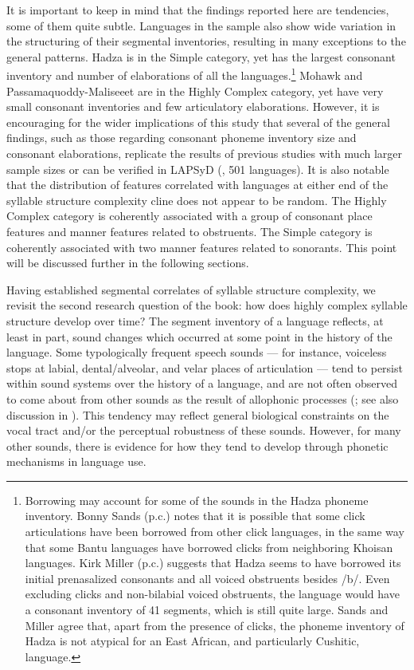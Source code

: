   It is important to keep in mind that the findings reported here are tendencies, some of them quite subtle. Languages in the sample also show wide variation in the structuring of their segmental inventories, resulting in many exceptions to the general patterns. Hadza is in the Simple category, yet has the largest consonant inventory and number of elaborations of all the languages.\footnote{ \textrm{Borrowing may account for some of the sounds in the Hadza phoneme inventory. Bonny Sands (p.c.) notes that it is possible that some click articulations have been borrowed from other click languages, in the same way that some Bantu languages have borrowed clicks from neighboring Khoisan languages. Kirk Miller (p.c.) suggests that Hadza seems to have borrowed its initial prenasalized consonants and all voiced obstruents besides /b/. Even excluding clicks and non-bilabial voiced obstruents, the language would have a consonant inventory of 41 segments, which is still quite large. Sands and Miller agree that, apart from the presence of clicks, the phoneme inventory of Hadza is not atypical for an East African, and particularly Cushitic, language.}} Mohawk and Passamaquoddy-Maliseeet are in the Highly Complex category, yet have very small consonant inventories and few articulatory elaborations. However, it is encouraging for the wider implications of this study that several of the general findings, such as those regarding consonant phoneme inventory size and consonant elaborations, replicate the results of previous studies with much larger sample sizes or can be verified in LAPSyD (\citealt{MaddiesonEtAl2013}, 501 languages). It is also notable that the distribution of features correlated with languages at either end of the syllable structure complexity cline does not appear to be random. The Highly Complex category is coherently associated with a group of consonant place features and manner features related to obstruents. The Simple category is coherently associated with two manner features related to sonorants. This point will be discussed further in the following sections.



  Having established segmental correlates of syllable structure complexity, we revisit the second research question of the book: how does highly complex syllable structure develop over time? The segment inventory of a language reflects, at least in part, sound changes which occurred at some point in the history of the language. Some typologically frequent speech sounds — for instance, voiceless stops at labial, dental/alveolar, and velar places of articulation — tend to persist within sound systems over the history of a language, and are not often observed to come about from other sounds as the result of allophonic processes (\citealt{Bybee2015a}; see also discussion in ). This tendency may reflect general biological constraints on the vocal tract and/or the perceptual robustness of these sounds. However, for many other sounds, there is evidence for how they tend to develop through phonetic mechanisms in language use. 




